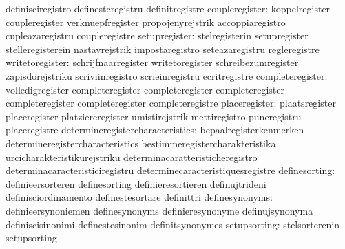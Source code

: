                                   definisciregistro                definesteregistru
                                  definitregistre
                  coupleregister: koppelregister                   coupleregister
                                  verknuepfregister                propojenyrejstrik
                                  accoppiaregistro                 cupleazaregistru
                                  coupleregistre
                   setupregister: stelregisterin                   setupregister
                                  stelleregisterein                nastavrejstrik
                                  impostaregistro                  seteazaregistru
                                  regleregistre
                 writetoregister: schrijfnaarregister              writetoregister
                                  schreibezumregister              zapisdorejstriku
                                  scriviinregistro                 scrieinregistru
                                  ecritregistre
                completeregister: volledigregister                 completeregister
                                  completeregister                 completeregister
                                  completeregister                 completeregister
                                  completeregistre
                   placeregister: plaatsregister                   placeregister
                                  platziereregister                umistirejstrik
                                  mettiregistro                    puneregistru
                                  placeregistre
determineregistercharacteristics: bepaalregisterkenmerken          determineregistercharacteristics
                                  bestimmeregistercharakteristika  urcicharakteristikurejstriku
                                  determinacaratteristicheregistro determinacaracteristiciregistru
                                  determinecaracteristiquesregistre
                   definesorting: definieersorteren                definesorting
                                  definieresortieren               definujtrideni
                                  definisciordinamento             definestesortare
                                  definittri
                  definesynonyms: definieersynoniemen              definesynonyms
                                  definieresynonyme                definujsynonyma
                                  definiscisinonimi                definestesinonim
                                  definitsynonymes
                    setupsorting: stelsorterenin                   setupsorting
